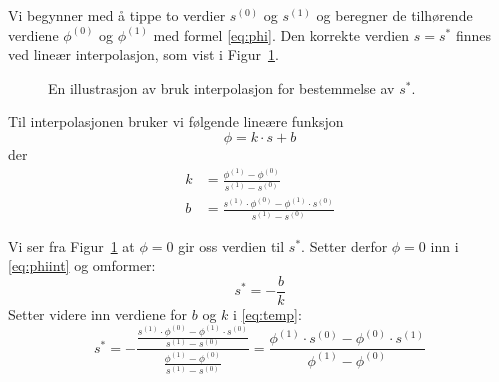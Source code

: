 Vi begynner med å tippe to verdier $s^{(0)}$ og $s^{(1)}$ og beregner de tilhørende verdiene $\phi^{(0)}$ og $\phi^{(1)}$ med formel \eqref{eq:phi}. Den korrekte verdien $s=s^*$ finnes ved lineær interpolasjon, som vist i Figur~\ref{fig:interpolasjon}.

\begin{figure}[htbp]
\centering
{}
\caption{En illustrasjon av bruk interpolasjon for bestemmelse av $s^*$.}
\label{fig:interpolasjon}
\end{figure}

Til interpolasjonen bruker vi følgende lineære funksjon
\begin{equation}
  \phi = k \cdot s + b \label{eq:phiint}
\end{equation}
der
\begin{align}
  k &= \frac{\phi^{(1)} - \phi^{(0)}}{s^{(1)}-s^{(0)}} \\
  b &= \frac{s^{(1)}\cdot\phi^{(0)} - \phi^{(1)}\cdot s^{(0)}}{s^{(1)}-s^{(0)}}
\end{align}

Vi ser fra Figur~\ref{fig:interpolasjon} at $\phi=0$ gir oss verdien til $s^*$. Setter derfor $\phi=0$ inn i \eqref{eq:phiint} og omformer:
\begin{equation}
  s^* = - \frac{b}{k} \label{eq:temp}
\end{equation}
Setter videre inn verdiene for $b$ og $k$ i \eqref{eq:temp}:
\begin{equation}
  s^* = - \dfrac{\frac{s^{(1)}\cdot\phi^{(0)} - \phi^{(1)}\cdot s^{(0)}}{s^{(1)}-s^{(0)}}}{\frac{\phi^{(1)} - \phi^{(0)}}{s^{(1)}-s^{(0)}}}
      = \dfrac{\phi^{(1)}\cdot s^{(0)} - \phi^{(0)}\cdot s^{(1)}}{\phi^{(1)} - \phi^{(0)}}
\end{equation}

